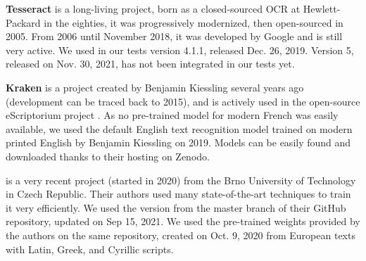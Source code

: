 \textbf{Tesseract} is a long-living project, born as a closed-sourced OCR at Hewlett-Packard in the eighties, it was progressively modernized, then open-sourced in 2005. From 2006 until November 2018, it was developed by Google and is still very active. We used in our tests version 4.1.1, released Dec. 26, 2019. Version 5, released on Nov. 30, 2021, has not been integrated in our tests yet.

\textbf{Kraken} is a project created by Benjamin Kiessling several years ago (development can be traced back to 2015), and is actively used in the open-source eScriptorium project \cite{kiessling_escriptorium_2019}.
As no pre-trained model for modern French was easily available, we used the default English text recognition model trained on modern printed English by Benjamin Kiessling on 2019. Models can be easily found and downloaded thanks to their hosting on Zenodo.

\textbf{\peroocr} is a very recent project (started in 2020) from the Brno University of Technology in Czech Republic.
Their authors used many state-of-the-art techniques to train it very efficiently.
We used the version from the master branch of their GitHub repository, updated on Sep 15, 2021.
We used the pre-trained weights provided by the authors on the same repository, created on Oct. 9, 2020 from European texts with Latin, Greek, and Cyrillic scripts.

